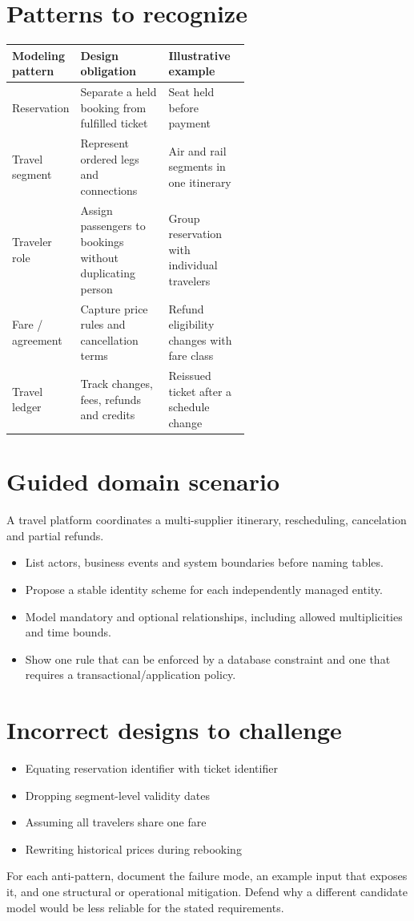 \documentclass[11pt,letterpaper]{article}
\begin{document}
\section{Patterns to recognize}
\begin{tabularx}{\linewidth}{@{}>{\raggedright\arraybackslash}p{0.22\linewidth} >{\raggedright\arraybackslash}p{0.37\linewidth}>{\raggedright\arraybackslash}X@{}}
\toprule
\textbf{Modeling pattern} & \textbf{Design obligation} & \textbf{Illustrative example} \\ 
\midrule
Reservation & Separate a held booking from fulfilled ticket & Seat held before payment \\ 
Travel segment & Represent ordered legs and connections & Air and rail segments in one itinerary \\ 
Traveler role & Assign passengers to bookings without duplicating person & Group reservation with individual travelers \\ 
Fare / agreement & Capture price rules and cancellation terms & Refund eligibility changes with fare class \\ 
Travel ledger & Track changes, fees, refunds and credits & Reissued ticket after a schedule change \\ 
\bottomrule
\end{tabularx}

\section{Guided domain scenario}
A travel platform coordinates a multi-supplier itinerary, rescheduling, cancelation and partial refunds.

\begin{itemize}
\item List actors, business events and system boundaries before naming tables.
\item Propose a stable identity scheme for each independently managed entity.
\item Model mandatory and optional relationships, including allowed multiplicities and time bounds.
\item Show one rule that can be enforced by a database constraint and one that requires a transactional/application policy.
\end{itemize}

\section{Incorrect designs to challenge}
\begin{itemize}
\item Equating reservation identifier with ticket identifier
\item Dropping segment-level validity dates
\item Assuming all travelers share one fare
\item Rewriting historical prices during rebooking
\end{itemize}
For each anti-pattern, document the failure mode, an example input that exposes it, and one structural or operational mitigation. Defend why a different candidate model would be less reliable for the stated requirements.
\end{document}
